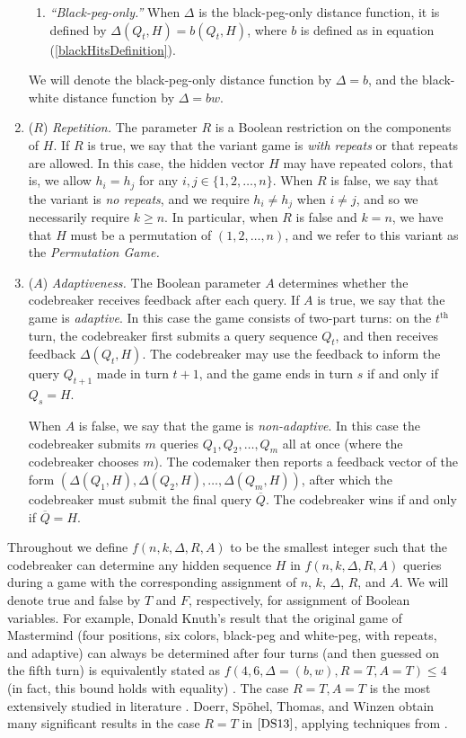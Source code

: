 \documentclass[12pt, a4paper]{article}
\newcommand{\nth}{^{\text{th}}}       %
\begin{document}
\begin{enumerate}[label=(\roman*)]
\begin{enumerate}[label=\alph*.]
		\item\textit{``Black-peg-only.''} When $\Delta$ is the black-peg-only distance function, it is defined by $\Delta(Q_t, H) = b(Q_t, H)$, where $b$ is defined as in equation (\ref{blackHitsDefinition}).
	\end{enumerate}
	We will denote the black-peg-only distance function by $\Delta = b$, and the black-white distance function by $\Delta = bw$.
	
	\item($R$) \textit{Repetition.} The parameter $R$ is a Boolean restriction on the components of $H$. If $R$ is true, we say that the variant game is \textit{with repeats} or that repeats are allowed. In this case, the hidden vector $H$ may have repeated colors, that is, we allow $h_i = h_j$ for any $i,j\in\{1,2,\ldots, n\}$. When $R$ is false, we say that the variant is \textit{no repeats}, and we require $h_i\neq h_j$ when $i\neq j$, and so we necessarily require $k \geq n$. In particular, when $R$ is false and $k = n$, we have that $H$ must be a permutation of $(1, 2, \ldots, n)$, and we refer to this variant as the \textit{Permutation Game.}
	
	\item($A$) \textit{Adaptiveness.} The Boolean parameter $A$ determines whether the codebreaker receives feedback after each query. If $A$ is true, we say that the game is \textit{adaptive}. In this case the game consists of two-part turns: on the $t\nth$ turn, the codebreaker first submits a query sequence $Q_t$, and then receives feedback $\Delta(Q_t, H)$. The codebreaker may use the feedback to inform the query $Q_{t+1}$ made in turn $t+1$, and the game ends in turn $s$ if and only if $Q_s = H$.
	
	When $A$ is false, we say that the game is \textit{non-adaptive}. In this case the codebreaker submits $m$ queries $Q_1, Q_2, \ldots, Q_m$ all at once (where the codebreaker chooses $m$). The codemaker then reports a feedback vector of the form $(\Delta(Q_1, H), \Delta(Q_2, H), \ldots, \Delta(Q_m, H))$, after which the codebreaker must submit the final query $\overline{Q}$. The codebreaker wins if and only if $\overline{Q} = H$.
\end{enumerate}

Throughout we define $f(n, k, \Delta, R, A)$ to be the smallest integer such that the codebreaker can determine any hidden sequence $H$ in $f(n, k, \Delta, R, A)$ queries during a game with the corresponding assignment of $n$, $k$, $\Delta$, $R$, and $A$. We will denote true and false by $T$ and $F$, respectively, for assignment of Boolean variables. For example, Donald Knuth's result that the original game of Mastermind (four positions, six colors, black-peg and white-peg, with repeats, and adaptive) can always be determined after four turns (and then guessed on the fifth turn) is equivalently stated as $f(4, 6, \Delta = (b,w), R=T, A=T)\le 4$ (in fact, this bound holds with equality) \cite{DK76}. The case $R = T, A = T$ is the most extensively studied in literature \cite{DK76,VC83,CC05,MG12}. Doerr, Sp\"ohel, Thomas, and Winzen obtain many significant results in the case $R = T$ in $\cite{DS13}$, applying techniques from \cite{GK00,NB09}. 
\end{document}
